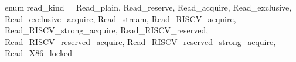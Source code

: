 enum read_kind = {
  Read_plain,
  Read_reserve,
  Read_acquire,
  Read_exclusive,
  Read_exclusive_acquire,
  Read_stream,
  Read_RISCV_acquire,
  Read_RISCV_strong_acquire,
  Read_RISCV_reserved,
  Read_RISCV_reserved_acquire,
  Read_RISCV_reserved_strong_acquire,
  Read_X86_locked
}
